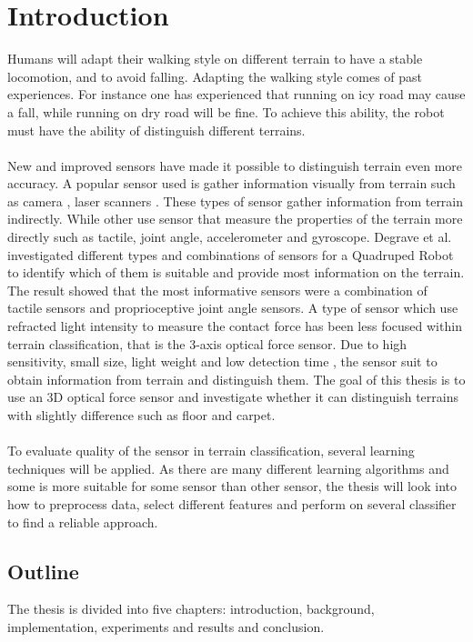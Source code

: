 \documentclass[USenglish]{ifimaster}  %
\begin{document}
\chapter{Introduction}                  %
Humans will adapt their walking style on different terrain to have a stable locomotion, and to avoid falling. Adapting the walking style comes of past experiences. For instance one has experienced that running on icy road may cause a fall, while running on dry road will be fine. To achieve this ability, the robot must have the ability of distinguish different terrains.
\\
\\ 
New and improved sensors have made it possible to distinguish terrain even more accuracy. A popular sensor used is gather information visually from terrain such as camera \cite{littleDog}, laser scanners \cite{4651026}. These types of sensor gather information from terrain indirectly. While other use sensor that measure the properties of the terrain more directly such as tactile, joint angle, accelerometer and gyroscope. Degrave et al.\cite{6784609} investigated different types and combinations of sensors for a Quadruped Robot to identify which of them is suitable and provide most information on the terrain. The result showed that the most informative sensors were a combination of tactile sensors and proprioceptive joint angle sensors. A type of sensor which use refracted light intensity to measure the contact force has been less focused within terrain classification, that is the 3-axis optical force sensor. Due to high sensitivity, small size, light weight and low detection time \cite{Dutta2016}, the sensor suit to obtain information from terrain and distinguish them. The goal of this thesis is to use an 3D optical force sensor and investigate whether it can distinguish terrains with slightly difference such as floor and carpet.
\\
\\
To evaluate quality of the sensor in terrain classification, several learning techniques will be applied. As there are many different learning algorithms and some is more suitable for some sensor than other sensor, the thesis will look into how to preprocess data, select different features and perform on several classifier to find a reliable approach.


\section{Outline}
The thesis is divided into five chapters: introduction, background, implementation,  experiments and results and conclusion. 
\end{document}
